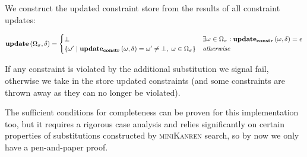 We construct the updated constraint store from the results of all constraint updates:

\[
\mathbf{update}\,(\Omega_\sigma, \delta) =
\begin{cases}
  \bot                                                 & \exists \omega \in \Omega_\sigma: \mathbf{update_{constr}}\,(\omega, \delta) = \epsilon \\
  \{ \omega' \mid \mathbf{update_{constr}}\,(\omega, \delta) = \omega' \neq \bot, \; \omega \in \Omega_\sigma \}   & \textit{otherwise}
\end{cases}
\]

If any constraint is violated by the additional substitution we signal fail, otherwise we take in the store updated constraints
(and some constraints are thrown away as they can no longer be violated).

The sufficient conditions for completeness can be proven for this implementation too, but it requires a rigorous case analysis
and relies significantly on certain properties of substitutions constructed by \textsc{miniKanren} search, so by now we only have a pen-and-paper proof.
